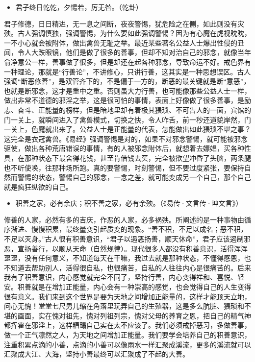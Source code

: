 \begin{itemize}\it
    \item 君子终日乾乾，夕惕若，厉无咎。（乾卦）
\end{itemize}

君子修德，日日精进，无一息之间断，夜夜警惕，犹危险之在侧，如此则没有灾殃。古人强调慎独，强调警惕，为什么要如此强调警惕？因为有心魔在虎视眈眈，一不小心就会被附体，做出禽兽无耻之举。最近某些著名公益人士爆出性侵的丑闻，令人大跌眼镜，他们是做了很多的善事，但却不知对治自己的邪念，就像当年俞净意公一样，善事做了很多，但是却还在起各种邪念，导致命运不好。戒色界有一种理论，那就是“行善论”，不讲修心，只讲行善，这其实是一种思想误区。古人强调“断恶修善”，是双管齐下的，不是偏于一方的，断恶的最关键就是断“意恶”，也就是断邪念，这才是重中之重。否则虽大力行善，也可能像那些公益人士一样，做出非常不道德的邪淫之举，这是很可怕的事情，表面上好像做了很多善事，是励志、奋斗、正能量的榜样，但是暗地里却有着极其猥琐、不可告人的一面，宾馆的门一关上，就瞬间进入了禽兽模式，切换之快，令人咋舌，前一秒还道貌岸然，门一关上，色魔就出来了。公益人士是正能量的代表，怎能做出如此猥琐不堪之事？这完全是衣冠禽兽。《易经》强调警惕是对的，如果不对邪念警惕，就可能被邪念驱使，做出各种荒唐错误的事情，有的人被邪念附体后，就想着去嫖娼，买各种性具，在那种状态下最舍得花钱，甚至肯借钱去买，完全被欲望冲昏了头脑，两条腿也不听使唤，往那种场所跑。真的要警惕，时刻警惕，但不要过度紧张，要保持自然而警惕的状态，警惕自己的邪念，一念之差，就可能变成另一个自己，那个自己就是疯狂纵欲的自己。

\begin{itemize}\it
    \item 积善之家，必有余庆；积不善之家，必有余殃。（《易传·文言传·坤文言》）
\end{itemize}

修善的人家，必然有多的吉庆，作恶的人家，必多祸殃。所阐述的是一种事物由循序渐进、慢慢积累，最终量变引起质变的现象。“善不积，不足以成名；恶不积，不足以灭身。”古人很有积善意识，“君子以遏恶扬善，顺天休命”，君子应该遏制邪恶，宣扬善行，以顺从天命（自然规律）。现代很多人都没有积善意识，活得浑浑噩噩，没有任何意义，不知道每天在干嘛，我过去就是那种状态，不懂得感恩，也不知道去帮助别人，活得很自私，也很痛苦，自私的人往往内心是很痛苦的。后来我有了积善意识，内心感觉就完全不同了，坚持行善，内心变得祥和、喜悦、轻安。积善就是在增加正能量，内心会有一种崇高的感觉，也会觉得自己的人生变得很有意义。我们来到这个世界是要为天地之间增加正能量的，这样才能顶天立地，问心无愧！堂堂七尺男儿缩在角落里玩弄自己的生殖器，这是多么肮脏、猥琐和不堪的画面，实在愧对祖先，愧对列祖列宗，愧对父母的养育之恩，把自己的精气神都挥霍在邪淫上，这样糟蹋自己实在太不应该了。我们必须戒掉恶习，多做善事，做一个正气凛然之人，为天地之间增加正能量。我们要学会培养自己的积善意识，注重积累点滴的小善，点滴的小善可以像雨水一样汇聚成溪流，更多的溪流就可以汇聚成大江、大海，坚持小善最终可以汇聚成了不起的大善。

